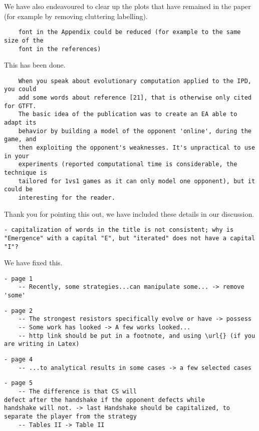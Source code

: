 \documentclass[a4]{article}
\begin{document}
We have also endeavoured to clear up the plots that have remained in the paper
(for example by removing cluttering labelling).

\begin{verbatim}
    font in the Appendix could be reduced (for example to the same size of the
    font in the references)
\end{verbatim}

This has been done.

\begin{verbatim}
    When you speak about evolutionary computation applied to the IPD, you could
    add some words about reference [21], that is otherwise only cited for GTFT.
    The basic idea of the publication was to create an EA able to adapt its
    behavior by building a model of the opponent 'online', during the game, and
    then exploiting the opponent's weaknesses. It's unpractical to use in your
    experiments (reported computational time is considerable, the technique is
    tailored for 1vs1 games as it can only model one opponent), but it could be
    interesting for the reader.
\end{verbatim}

Thank you for pointing this out, we have included these details in our
discussion.

\begin{verbatim}
- capitalization of words in the title is not consistent; why is "Emergence" with a capital "E", but "iterated" does not have a capital "I"?
\end{verbatim}

We have fixed this.

\begin{verbatim}
- page 1
	-- Recently, some strategies...can manipulate some... -> remove 'some'
\end{verbatim}

\begin{verbatim}
- page 2
	-- The strongest resistors specifically evolve or have -> possess
	-- Some work has looked -> A few works looked...
	-- http link should be put in a footnote, and using \url{} (if you are writing in Latex)
\end{verbatim}

\begin{verbatim}
- page 4
	-- ...to analytical results in some cases -> a few selected cases
\end{verbatim}

\begin{verbatim}
- page 5
	-- The difference is that CS will
defect after the handshake if the opponent defects while
handshake will not. -> last Handshake should be capitalized, to separate the player from the strategy
	-- Tables II -> Table II
\end{verbatim}
\end{document}
